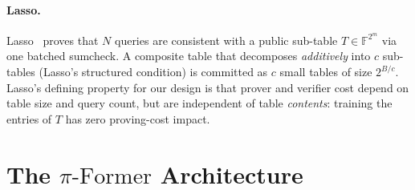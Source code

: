 \documentclass[letterpaper,twocolumn,10pt]{article}
\theoremstyle{remark}
\theoremstyle{definition}
\newcommand{\sys}{\ensuremath{\pi\text{-Former}}}
\newcommand{\FF}{\mathbb{F}}
\begin{document}
\paragraph{Lasso.}
\label{ssec:lasso}
Lasso~\cite{setty2024unlocking,arun2024jolt,fomenko2025understanding}
proves that $N$ queries are consistent with a public sub-table
$T\!\in\!\FF^{2^m}$ via one batched sumcheck. A composite table that
decomposes \emph{additively} into $c$ sub-tables (Lasso's structured
condition) is committed as $c$ small tables of size $2^{B/c}$. Lasso's
defining property for our design is that prover and verifier cost
depend on table size and query count, but are independent of table
\emph{contents}: training the entries of $T$ has zero proving-cost
impact.

\section{The \texorpdfstring{\sys{}}{Pi-Former} Architecture}
\label{sec:arch}
\end{document}
